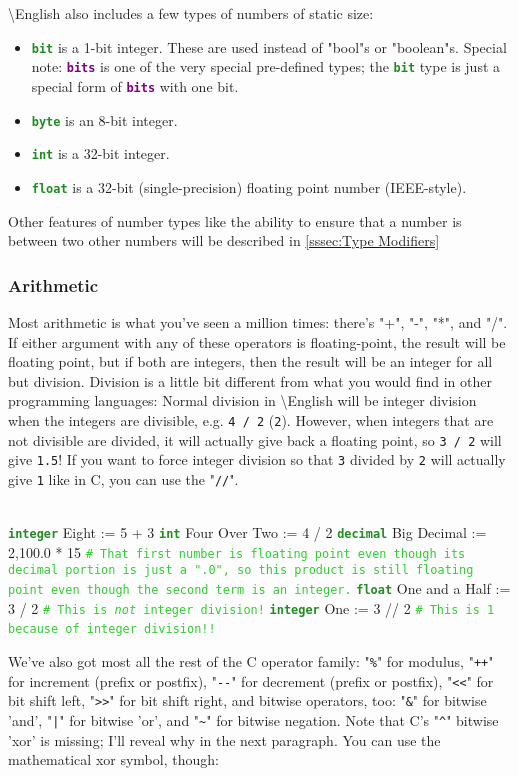 \documentclass{article}
\newcommand{\English}{\textbackslash{}English}				%
\newcommand{\sssecl}[1]{\subsubsection{#1}\label{sssec:#1}}
\newcommand{\codecomment}[1]{\texttt{\textcolor{LimeGreen}{#1}}}
\newcommand{\commentline}[1]{\codecomment{\# #1}}
\newcommand{\type}[1]{\texttt{\textcolor{ForestGreen}{\textbf{#1}}}}
\newcommand{\keyop}[1]{\texttt{\textcolor{Purple}{\textbf{#1}}}}
\newenvironment{code}[0]
{\ttfamily{}				%
\setlength\parindent{0cm}	%
~\\}
{\setlength\parindent{1cm}
~\\}
\begin{document}
\indent \English{} also includes a few types of numbers of static size:
\begin{itemize}
	\item \type{bit} is a 1-bit integer. These are used instead of "bool"s or "boolean"s. Special note: \keyop{bits} is one of the very special pre-defined types; the \type{bit} type is just a special form of \keyop{bits} with one bit.
	\item \type{byte} is an 8-bit integer.
	\item \type{int} is a 32-bit integer.
	\item \type{float} is a 32-bit (single-precision) floating point number (IEEE-style).
\end{itemize}

\indent Other features of number types like the ability to ensure that a number is between two other numbers will be described in \ref{sssec:Type Modifiers}

\sssecl{Arithmetic}
\indent Most arithmetic is what you've seen a million times: there's "+", "-", "*", and "/". If either argument with any of these operators is floating-point, the result will be floating point, but if both are integers, then the result will be an integer for all but division. Division is a little bit different from what you would find in other programming languages:
\indent Normal division in \English{} will be integer division when the integers are divisible, e.g. \texttt{4 / 2} (\texttt{2}). However, when integers that are not divisible are divided, it will actually give back a floating point, so \texttt{3 / 2} will give \texttt{1.5}! If you want to force integer division so that \texttt{3} divided by \texttt{2} will actually give \texttt{1} like in C, you can use the "\texttt{//}".

\begin{code}
\type{integer} Eight := 5 + 3
\type{int} Four Over Two := 4 / 2
\type{decimal} Big Decimal := 2,100.0 * 15 \commentline{That first number is floating point even though its decimal portion is just a ".0", so this product is still floating point even though the second term is an integer.}
\type{float} One and a Half := 3 / 2 \commentline{This is \emph{not} integer division!}
\type{integer} One := 3 // 2 \commentline{This is 1 because of integer division!!}
\end{code}

\indent We've also got most all the rest of the C operator family: "\texttt{\%}" for modulus, "\texttt{++}" for increment (prefix or postfix), "\verb+--+" for decrement (prefix or postfix), "\verb+<<+" for bit shift left, "\verb+>>+" for bit shift right, and bitwise operators, too: "\texttt{\&}" for bitwise 'and', "\texttt{|}" for bitwise 'or', and "\texttt{\textasciitilde}" for bitwise negation.
\indent Note that C's "\texttt{\^}" bitwise 'xor' is missing; I'll reveal why in the next paragraph. You can use the mathematical xor symbol, though:
\end{document}
